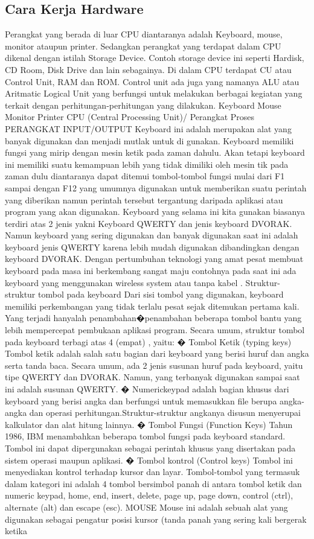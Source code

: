 \subsection{Cara Kerja Hardware}
Perangkat yang berada di luar CPU diantaranya adalah Keyboard, mouse, monitor ataupun printer. Sedangkan perangkat yang terdapat dalam CPU dikenal dengan istilah Storage Device. Contoh storage device ini seperti Hardisk, CD Room, Disk Drive dan lain sebagainya. Di dalam CPU terdapat CU atau Control Unit, RAM dan ROM. Control unit ada juga yang namanya ALU atau Aritmatic Logical Unit yang berfungsi untuk melakukan berbagai kegiatan yang terkait dengan perhitungan-perhitungan yang dilakukan.
Keyboard Mouse Monitor Printer CPU (Central Processing Unit)/ Perangkat Proses PERANGKAT INPUT/OUTPUT Keyboard ini adalah merupakan alat yang banyak digunakan dan menjadi mutlak untuk di gunakan. Keyboard memiliki fungsi yang mirip dengan mesin ketik pada zaman dahulu. Akan tetapi keyboard ini memiliki  suatu kemampuan lebih yang tidak dimiliki oleh mesin tik pada zaman dulu diantaranya dapat ditemui tombol-tombol fungsi mulai dari F1 sampai dengan F12 yang umumnya digunakan untuk memberikan suatu perintah yang diberikan namun perintah tersebut tergantung daripada aplikasi atau program yang akan digunakan. Keyboard yang selama ini kita gunakan biasanya terdiri atas 2 jenis yakni Keyboard QWERTY dan jenis keyboard DVORAK. Namun keyboard yang sering digunakan dan banyak digunakan saat ini adalah keyboard jenis QWERTY karena lebih mudah digunakan dibandingkan dengan keyboard DVORAK. Dengan pertumbuhan teknologi yang amat pesat membuat keyboard pada masa ini berkembang sangat maju contohnya pada saat ini ada keyboard yang menggunakan wireless system atau tanpa kabel . Struktur-struktur tombol pada keyboard Dari sisi tombol yang digunakan, keyboard memiliki perkembangan yang tidak     terlalu pesat sejak ditemukan pertama kali. Yang terjadi hanyalah penambahan�penambahan beberapa tombol bantu yang lebih mempercepat pembukaan aplikasi program. Secara umum, struktur tombol pada keyboard terbagi atas 4 (empat) , yaitu: � Tombol Ketik (typing keys) Tombol ketik adalah salah satu bagian dari keyboard yang berisi huruf dan angka serta tanda baca. Secara umum, ada 2 jenis susunan huruf pada keyboard, yaitu tipe QWERTY dan DVORAK. Namun, yang terbanyak digunakan sampai saat ini adalah susunan QWERTY. � Numerickeypad adalah bagian khusus dari keyboard yang berisi angka dan berfungsi untuk memasukkan file berupa angka-angka dan operasi perhitungan.Struktur-struktur angkanya disusun menyerupai kalkulator dan alat hitung lainnya. � Tombol Fungsi (Function Keys) Tahun 1986, IBM menambahkan beberapa tombol fungsi pada keyboard standard. Tombol ini dapat dipergunakan sebagai perintah khusus yang disertakan pada sistem operasi maupun aplikasi. � Tombol kontrol (Control keys) Tombol ini menyediakan kontrol terhadap kursor dan layar. Tombol-tombol yang termasuk dalam kategori ini adalah 4 tombol bersimbol panah di antara tombol ketik dan numeric keypad, home, end, insert, delete, page up, page down, control (ctrl), alternate (alt) dan escape (esc). MOUSE Mouse ini adalah sebuah alat yang digunakan sebagai pengatur posisi kursor (tanda panah yang sering kali bergerak ketika 